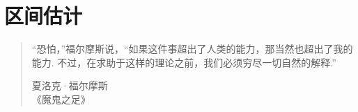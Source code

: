\section{区间估计}\label{sec:9}
\begin{quote}
“恐怕，”福尔摩斯说，“如果这件事超出了人类的能力，那当然也超出了我的能力. 不过，在求助于这样的理论之前，我们必须穷尽一切自然的解释.”
\begin{flushright}夏洛克·福尔摩斯\\《魔鬼之足》\end{flushright}
\end{quote}





